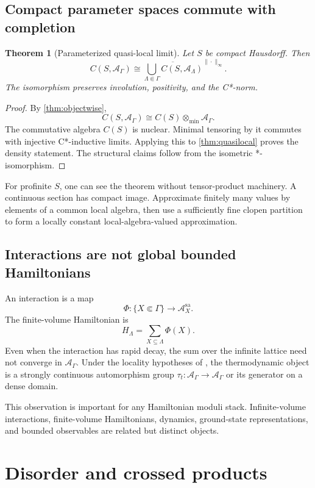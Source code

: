 \documentclass[12pt]{article}
\newtheorem{theorem}{Theorem}[section]
\theoremstyle{definition}
\theoremstyle{remark}
\newcommand{\A}{\mathcal A}
\begin{document}
\subsection{Compact parameter spaces commute with completion}

\begin{theorem}[Parameterized quasi-local limit]\label{thm:param-limit}
Let $S$ be compact Hausdorff.  Then
\[
C(S,\A_\Gamma)
\cong
\overline{
\bigcup_{\Lambda\Subset\Gamma}C(S,\A_\Lambda)
}^{\|\cdot\|_\infty}.
\]
The isomorphism preserves involution, positivity, and the C*-norm.
\end{theorem}

\begin{proof}
By \cref{thm:objectwise},
\[
C(S,\A_\Gamma)\cong C(S)\otimes_{\min}\A_\Gamma.
\]
The commutative algebra $C(S)$ is nuclear.  Minimal tensoring by it commutes with
injective C*-inductive limits.  Applying this to \cref{thm:quasilocal} proves the
density statement.  The structural claims follow from the isometric
*-isomorphism.
\end{proof}

For profinite $S$, one can see the theorem without tensor-product machinery.  A
continuous section has compact image.  Approximate finitely many values by elements
of a common local algebra, then use a sufficiently fine clopen partition to form a
locally constant local-algebra-valued approximation.

\subsection{Interactions are not global bounded Hamiltonians}

An interaction is a map
\[
\Phi:\{X\Subset\Gamma\}\longrightarrow\A_X^{\mathrm{sa}}.
\]
The finite-volume Hamiltonian is
\[
H_\Lambda=\sum_{X\subseteq\Lambda}\Phi(X).
\]
Even when the interaction has rapid decay, the sum over the infinite lattice need
not converge in $\A_\Gamma$.  Under the locality hypotheses of \cite{NSY}, the
thermodynamic object is a strongly continuous automorphism group
$\tau_t:\A_\Gamma\to\A_\Gamma$ or its generator on a dense domain.

This observation is important for any Hamiltonian moduli stack.  Infinite-volume
interactions, finite-volume Hamiltonians, dynamics, ground-state representations,
and bounded observables are related but distinct objects.

\section{Disorder and crossed products}
\end{document}
